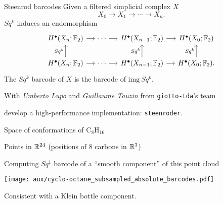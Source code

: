 \begin{frame}[fragile]{Steenrod barcodes} \pause
	Given a filtered simplicial complex $X$
	\[
	X_0 \to X_1 \to \cdots \to X_n.
	\]
	\pause
	$Sq^k$ induces an endomorphism
	\[
	\begin{tikzcd}[column sep = small]
	H^\bullet(X_n; \Ftwo) \arrow[r] & \cdots \arrow[r] & H^\bullet(X_{n-1}; \Ftwo) \arrow[r] & H^\bullet(X_0; \Ftwo) \\
	H^\bullet(X_n; \Ftwo) \arrow[u, "Sq^k"] \arrow[r] & \cdots \arrow[r] & H^\bullet(X_{n-1}; \Ftwo) \arrow[u, "Sq^k"] \arrow[r] & H^\bullet(X_0; \Ftwo) \arrow[u, "Sq^k"].
	\end{tikzcd}
	\]
	The \textcolor{pblue}{$Sq^k$ barcode} of $X$ is the barcode of $\mathrm{img}\ Sq^k$.

	\bigskip \pause

	With \textit{Umberto Lupo} and \textit{Guillaume Tauzin} from \textcolor{pblue}{\texttt{giotto-tda}}'s team

	\medskip
	develop a high-performance implementation: \textcolor{pblue}{\texttt{steenroder}}.
\end{frame}

\begin{frame}{Space of conformations of $\mathrm{C_8H_{16}}$}

	Points in $\mathbb{R}^{24}$ (positions of $8$ carbons in $\mathbb{R}^3$)

	\pause \smallskip

	Computing $Sq^1$ barcode of a ``smooth component'' of this point cloud

	\smallskip

	\texttt{[image: aux/cyclo-octane\_subsampled\_absolute\_barcodes.pdf]}

	Consistent with a \textcolor{pblue}{Klein bottle} component.
\end{frame}

